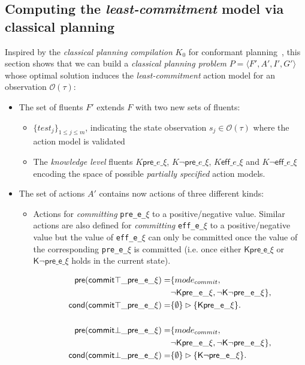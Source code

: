 \documentclass{article}
\newcommand{\tup}[1]{{\langle #1 \rangle}}
\newcommand{\pre}{\mathsf{pre}}     %
\newcommand{\eff}{\mathsf{eff}}     %
\newcommand{\cond}{\mathsf{cond}}   %
\begin{document}
\subsection{Computing the {\em least-commitment} model via classical planning}
Inspired by the {\em classical planning compilation} $K_0$ for conformant planning~\cite{palacios-conformant-JAIR09}, this section shows that we can build a {\em classical planning problem} $P=\tup{F',A',I',G'}$ whose optimal solution induces the {\em least-commitment} action model for an observation $\mathcal{O}(\tau)$: 
\begin{itemize}
\item The set of fluents $F'$ extends $F$ with two new sets of fluents:
      \begin{itemize}
      \item $\{test_j\}_{1\leq j\leq m}$, indicating the state observation $s_j\in\mathcal{O}(\tau)$ where the action model is validated
      \item The {\em knowledge level} fluents {\tt\small $K\pre\_e\_\xi$}, {\tt\small $K\neg\pre\_e\_\xi$}, {\tt\small $K\eff\_e\_\xi$} and {\tt\small $K\neg\eff\_e\_\xi$} encoding the space of possible {\em partially specified} action models.
      \end {itemize}
\item The set of actions $A'$ contains now actions of three different kinds:
\begin{itemize}
      \item Actions for {\em committing} {\tt\small pre\_e\_$\xi$} to a positive/negative value. Similar actions are also defined for {\em committing} {\tt\small eff\_e\_$\xi$} to a positive/negative value but the value of {\tt\small eff\_e\_$\xi$} can only be committed once the value of the corresponding {\tt\small pre\_e\_$\xi$} is committed (i.e. once either $\mathsf{K\pre\_e\_\xi}$ or $\mathsf{K\neg\pre\_e\_\xi}$ holds in the current state).
\begin{small}
\begin{align*}
\hspace*{7pt}\pre(\mathsf{commit\top\_pre\_e\_\xi})=&\{mode_{commit}, \\
&\mathsf{\neg K\pre\_e\_\xi}, \mathsf{\neg K\neg\pre\_e\_\xi}\},\\
\cond(\mathsf{commit\top\_pre\_e\_\xi})=&\{\emptyset\}\rhd\{\mathsf{K\pre\_e\_\xi}\}.\\\\
\hspace*{7pt}\pre(\mathsf{commit\bot\_pre\_e\_\xi})=&\{mode_{commit}, \\
&\mathsf{\neg K\pre\_e\_\xi},\mathsf{\neg K\neg\pre\_e\_\xi}\},\\
\cond(\mathsf{commit\bot\_pre\_e\_\xi})=&\{\emptyset\}\rhd\{\mathsf{K\neg\pre\_e\_\xi}\}.
\end{align*}
\end{small}


\end{itemize}
\end{itemize}
\end{document}
